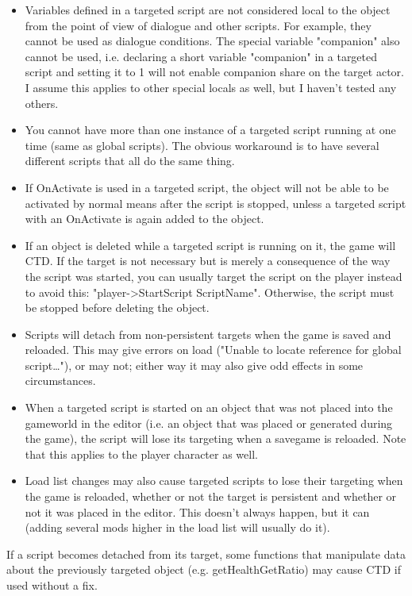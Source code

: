 \documentclass[
]{article}
\begin{document}
\begin{itemize}
\item
  Variables defined in a targeted script are not considered local to the
  object from the point of view of dialogue and other scripts. For
  example, they cannot be used as dialogue conditions. The special
  variable "companion" also cannot be used, i.e. declaring a short
  variable "companion" in a targeted script and setting it to 1 will not
  enable companion share on the target actor. I assume this applies to
  other special locals as well, but I haven't tested any others.
\item
  You cannot have more than one instance of a targeted script running at
  one time (same as global scripts). The obvious workaround is to have
  several different scripts that all do the same thing.
\item
  If OnActivate is used in a targeted script, the object will not be
  able to be activated by normal means after the script is stopped,
  unless a targeted script with an OnActivate is again added to the
  object.
\item
  If an object is deleted while a targeted script is running on it, the
  game will CTD. If the target is not necessary but is merely a
  consequence of the way the script was started, you can usually target
  the script on the player instead to avoid this:
  "player-\textgreater StartScript ScriptName". Otherwise, the script
  must be stopped before deleting the object.
\item
  Scripts will detach from non-persistent targets when the game is saved
  and reloaded. This may give errors on load ("Unable to locate
  reference for global script\ldots"), or may not; either way it may
  also give odd effects in some circumstances.
\item
  When a targeted script is started on an object that was not placed
  into the gameworld in the editor (i.e. an object that was placed or
  generated during the game), the script will lose its targeting when a
  savegame is reloaded. Note that this applies to the player character
  as well.
\item
  Load list changes may also cause targeted scripts to lose their
  targeting when the game is reloaded, whether or not the target is
  persistent and whether or not it was placed in the editor. This
  doesn't always happen, but it can (adding several mods higher in the
  load list will usually do it).
\end{itemize}

If a script becomes detached from its target, some functions that
manipulate data about the previously targeted object (e.g.
getHealthGetRatio) may cause CTD if used without a fix.
\end{document}
